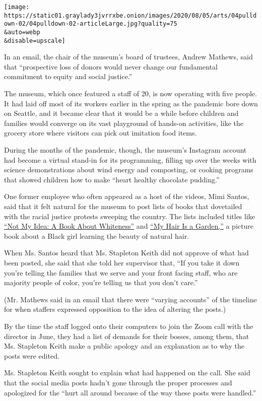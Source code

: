 \texttt{[image: https://static01.graylady3jvrrxbe.onion/images/2020/08/05/arts/04pulldown-02/04pulldown-02-articleLarge.jpg?quality=75\\\&auto=webp\\\&disable=upscale]}

In an email, the chair of the museum's board of trustees, Andrew
Mathews, said that ``prospective loss of donors would never change our
fundamental commitment to equity and social justice.''

The museum, which once featured a staff of 20, is now operating with
five people. It had laid off most of its workers earlier in the spring
as the pandemic bore down on Seattle, and it became clear that it would
be a while before children and families would converge on its vast
playground of hands-on activities, like the grocery store where visitors
can pick out imitation food items.

During the months of the pandemic, though, the museum's Instagram
account had become a virtual stand-in for its programming, filling up
over the weeks with science demonstrations about wind energy and
composting, or cooking programs that showed children how to make ``heart
healthy chocolate pudding.''

One former employee who often appeared as a host of the videos, Mimi
Santos, said that it felt natural for the museum to post lists of books
that dovetailed with the racial justice protests sweeping the country.
The lists included titles like
\href{https://anastasiahigginbotham.com/not-my-idea/}{``Not My Idea: A
Book About Whiteness''} and
\href{https://www.albertwhitman.com/book/my-hair-is-a-garden/}{``My Hair
Is a Garden,''} a picture book about a Black girl learning the beauty of
natural hair.

When Ms. Santos heard that Ms. Stapleton Keith did not approve of what
had been posted, she said that she told her supervisor that, ``If you
take it down you're telling the families that we serve and your front
facing staff, who are majority people of color, you're telling us that
you don't care.''

(Mr. Mathews said in an email that there were ``varying accounts'' of
the timeline for when staffers expressed opposition to the idea of
altering the posts.)

By the time the staff logged onto their computers to join the Zoom call
with the director in June, they had a list of demands for their bosses,
among them, that Ms. Stapleton Keith make a public apology and an
explanation as to why the posts were edited.

Ms. Stapleton Keith sought to explain what had happened on the call. She
said that the social media posts hadn't gone through the proper
processes and apologized for the ``hurt all around because of the way
these posts were handled.''

